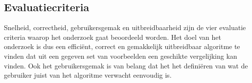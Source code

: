 \documentclass[Main.tex]{subfiles}
\begin{document}
\subsection{Evaluatiecriteria}

Snelheid, correctheid, gebruikersgemak en uitbreidbaarheid zijn de vier evaluatie criteria waarop het onderzoek gaat beoordeeld worden. Het doel van het onderzoek is dus een effici\"ent, correct en gemakkelijk uitbreidbaar algoritme te vinden dat uit een gegeven set van voorbeelden een geschikte vergelijking kan vinden. Ook het gebruikersgemak is van belang dat het het defini\"eren van wat de gebruiker juist van het algoritme verwacht eenvoudig is.
\end{document}
